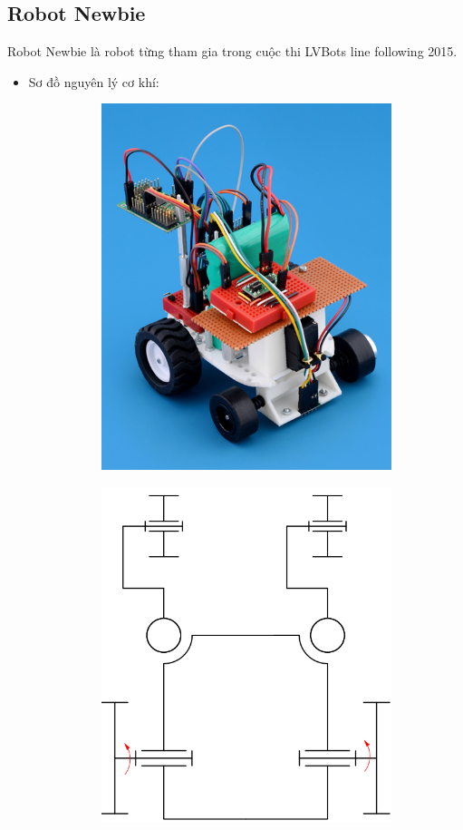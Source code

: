     \subsection{Robot Newbie}
        \hspace*{0.6cm} Robot Newbie là robot từng tham gia trong cuộc thi LVBots line following 2015.
        \begin{itemize}
            \item Sơ đồ nguyên lý cơ khí:
            \begin{figure}[H]
                \begin{subfigure}{0.5\textwidth}
                \centering
                \includegraphics[width=0.6\linewidth, right]{pictures/chapter1/chapter1_pic12a_newbie.png} 
                \label{chap1_pic12a}
                \end{subfigure}
                \begin{subfigure}{0.7\textwidth}
                \includegraphics[width=0.55\linewidth]{pictures/chapter1/chapter1_pic12b_newbie.png}

\end{subfigure}
\end{figure}
\end{itemize}
